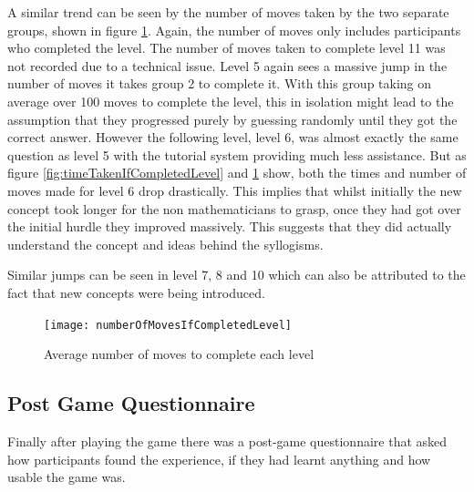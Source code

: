 \documentclass[12pt,a4paper]{report}
\begin{document}
A similar trend can be seen by the number of moves taken by the two separate groups, shown in figure \ref{fig:numberOfMovesIfCompletedLevel}. Again, the number of moves only includes participants who completed the level. The number of moves taken to complete level 11 was not recorded due to a technical issue. Level 5 again sees a massive jump in the number of moves it takes  group 2 to complete it. With this group taking on average over 100 moves to complete the level, this in isolation might lead to the assumption that they progressed purely by guessing randomly until they got the correct answer. However the following level, level 6, was almost exactly the same question as level 5 with the tutorial system providing much less assistance. But as figure  \ref{fig:timeTakenIfCompletedLevel} and \ref{fig:numberOfMovesIfCompletedLevel} show, both the times and number of moves made for level 6 drop drastically. This implies that whilst initially the new concept took longer for the non mathematicians to grasp, once they had got over the initial hurdle they improved massively. This suggests that they did actually understand the concept and ideas behind the syllogisms. 

Similar jumps can be seen in level 7, 8 and 10 which can also be attributed to the fact that new concepts were being introduced.

\begin{figure}[h]
\centering
    \texttt{[image: numberOfMovesIfCompletedLevel]}
    \caption{Average number of moves to complete each level}
        \label{fig:numberOfMovesIfCompletedLevel}
\end{figure}
\FloatBarrier

\subsection{Post Game Questionnaire}
Finally after playing the game there was a post-game questionnaire that asked how participants found the experience, if they had learnt anything and how usable the game was.
\end{document}
